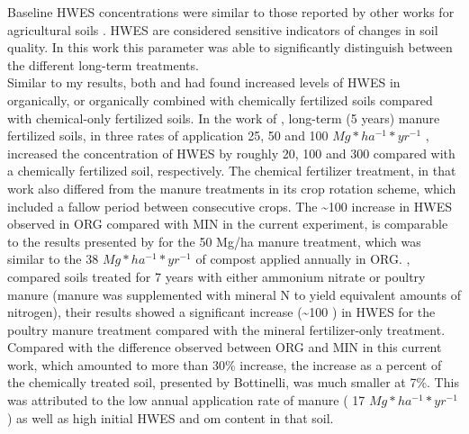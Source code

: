 	Baseline HWES concentrations were similar to those reported by other works for agricultural soils \citep{haynes2005, yousefi2008, puget1998}. HWES are considered sensitive indicators of changes in soil quality\myRed{*}. In this work this parameter was able to significantly distinguish between the different long-term treatments.\\
	Similar to my results, both \citet{yousefi2008} and \citet{bottinelli2017} had found increased levels of HWES in organically, or organically combined with chemically fertilized soils compared with chemical-only fertilized soils.
	In the work of \citet{yousefi2008}, long-term (5 years) manure fertilized soils, in three rates of application  25, 50 and 100 $ Mg * ha^{-1} * yr^{-1}  $ , increased the concentration of HWES by roughly 20, 100 and 300 \genericunit compared with a chemically fertilized soil, respectively. The chemical fertilizer treatment, in that work also differed from the manure treatments in its crop rotation scheme, which included a fallow period between consecutive crops. The \~{}100 \genericunit increase in HWES observed in ORG compared with MIN in the current experiment, is comparable to the results presented by \citeauthor{yousefi2008} for the 50 Mg/ha manure treatment, which was similar to the 38 $ Mg * ha^{-1} * yr^{-1}  $ of compost applied annually in ORG.
	\citet{bottinelli2017}, compared soils treated for 7 years with either ammonium nitrate or poultry manure (manure was supplemented with mineral N to yield equivalent amounts of nitrogen), their results  showed a significant increase (\~{}100 \genericunit) in HWES for the poultry manure treatment compared with the mineral fertilizer-only treatment.
	Compared with the difference observed between ORG and MIN in this current work, which amounted to more than 30\% increase, the increase as a percent of the  chemically treated soil, presented by Bottinelli, was much smaller at 7\%. This was attributed to the low annual application rate of manure ( 17 $ Mg * ha^{-1} * yr^{-1}  $ ) as well as high initial HWES and \gls{om} content in that soil.

